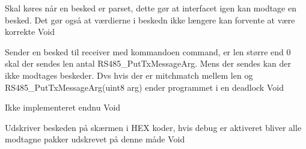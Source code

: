 {Skal køres når en besked er parset, dette gør at interfacet igen kan modtage en besked. Det gør også at værdierne i beskedn ikke længere kan forvente at være korrekte}
{Void}
{}

{Sender en besked til receiver med kommandoen command, er len større end 0 skal der sendes len antal RS485\_PutTxMessageArg. Mens der sendes kan der ikke modtages beskeder. Dvs hvis der er mitchmatch mellem len og RS485\_PutTxMessageArg(uint8 arg) ender programmet i en deadlock}
{Void}
{
}

{Ikke implementeret endnu }
{Void}
{
}

{Udskriver beskeden på skærmen i HEX koder, hvis debug er aktiveret bliver alle modtagne pakker udskrevet på denne måde}
{Void}
{
}